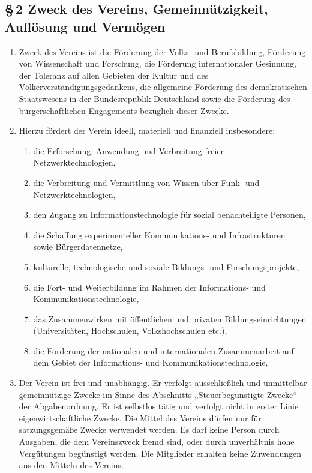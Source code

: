 \documentclass[12pt,a4paper]{article}
\begin{document}
\subsection*{§\,2 Zweck des Vereins, Gemeinnützigkeit, Auflösung und Vermögen}
\begin{enumerate}
\item Zweck des Vereins ist die Förderung der Volks- und Berufsbildung, Förderung von Wissenschaft und Forschung, die Förderung internationaler Gesinnung, der Toleranz auf allen Gebieten der Kultur und des Völkerverständigungsgedankens, die allgemeine Förderung des demokratischen Staatswesens in der Bundesrepublik Deutschland sowie die Förderung des bürgerschaftlichen Engagements bezüglich dieser Zwecke.
\item Hierzu fördert der Verein ideell, materiell und finanziell insbesondere:
\begin{enumerate}
\item die Erforschung, Anwendung und Verbreitung freier Netz\-werktechnologien,
\item die Verbreitung und Vermittlung von Wissen über Funk- und Netz\-werktechnologien,
\item den Zugang zu Informationstechnologie für sozial benachteiligte Personen,
\item die Schaffung experimenteller Kommunikations- und Infrastrukturen sowie Bürgerdatennetze,
\item kulturelle, technologische und soziale Bildungs- und Forschungsprojekte,
\item die Fort- und Weiterbildung im Rahmen der Informations- und Kommunikationstechnologie,
\item das Zusammenwirken mit öffentlichen und privaten Bildungseinrichtungen (Universitäten, Hochschulen, Volkshochschulen etc.),
\item die Förderung der nationalen und internationalen Zusammenarbeit auf dem Gebiet der Informations- und Kommunikationstechnologie,
\end{enumerate}
\item Der Verein ist frei und unabhängig. Er verfolgt ausschließlich und unmittelbar gemeinnützige Zwecke im Sinne des Abschnitts „Steuerbegünstigte Zwecke“ der Abgabenordnung. Er ist selbstlos tätig und verfolgt nicht in erster Linie eigenwirtschaftliche Zwecke. Die Mittel des Vereins dürfen nur für satzungsgemäße Zwecke verwendet werden. Es darf keine Person durch Ausgaben, die dem Vereinszweck fremd sind, oder durch unverhältnis hohe Vergütungen begünstigt werden. Die Mitglieder erhalten keine Zuwendungen aus den Mitteln des Vereins.

\end{enumerate}
\end{document}
